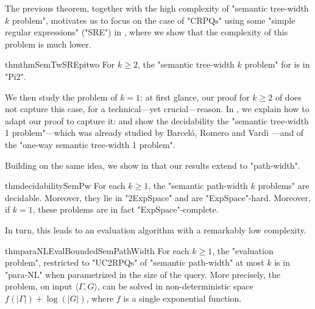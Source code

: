 
The previous theorem, together with the high complexity of "semantic tree-width $k$ problem",
motivates us to focus on the case of "CRPQs" using some "simple regular expressions" ("SRE") in , where we show that the complexity of this problem is much lower.

\begin{restatable*}{thm}{thmSemTwSREpitwo}
    \AP\label{thm:semtw-sre-pitwo}
    For $k\geq 2$, the "semantic tree-width $k$ problem" for {\UCRPQSRE} is in "Pi2".
\end{restatable*}

We then study the problem of $k=1$: at first glance, our proof for $k\geq 2$ of
 does not capture this case, for a technical---yet crucial---reason. In
, we explain how to adapt our proof to capture it: 
and show the decidability the "semantic tree-width 1 problem"---which was already studied by 
Barceló, Romero and Vardi \cite{BarceloRV16}---and of the "one-way semantic tree-width 1 problem". 

Building on the same idea, we show in  that our results extend to "path-width".
\begin{restatable*}{thm}{decidabilitySemPw}
    \AP\label{thm:decidability-sempw}
    For each $k \geq 1$,
    the "semantic path-width $k$ problems" are decidable. Moreover, they lie in "2ExpSpace"
    and are "ExpSpace"-hard. Moreover, if $k=1$, these problems are in fact "ExpSpace"-complete.
\end{restatable*}
In turn, this leads to an evaluation algorithm with a remarkably low complexity.
\begin{restatable*}{thm}{paraNLEvalBoundedSemPathWidth}
	\AP\label{thm:evaluation-bounded-pathwidth}
	For each $k \geq 1$, the "evaluation problem", restricted to "UC2RPQs" of
	"semantic path-width" at most $k$ is in "para-NL" when parametrized in the size of the query.
	More precisely, the problem, on input $\langle \Gamma, G \rangle$, can be solved in
	non-deterministic space $f(|\Gamma|) + \log(|G|)$, where $f$ is a single exponential
	function.
\end{restatable*}

